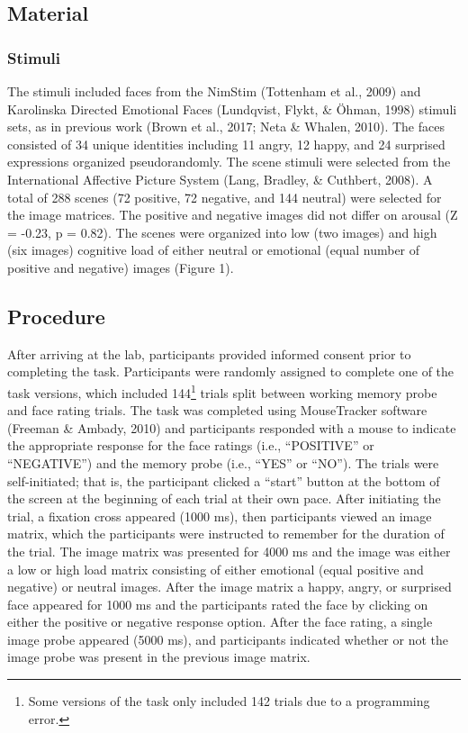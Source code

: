 \documentclass[man]{apa6}
\let\rmarkdownfootnote\footnote%
\def\footnote{\protect\rmarkdownfootnote}
\begin{document}
\hypertarget{material}{%
\subsection{Material}\label{material}}

\hypertarget{stimuli}{%
\subsubsection{Stimuli}\label{stimuli}}

The stimuli included faces from the NimStim (Tottenham et al., 2009) and Karolinska Directed Emotional Faces (Lundqvist, Flykt, \& Öhman, 1998) stimuli sets, as in previous work (Brown et al., 2017; Neta \& Whalen, 2010). The faces consisted of 34 unique identities including 11 angry, 12 happy, and 24 surprised expressions organized pseudorandomly. The scene stimuli were selected from the International Affective Picture System (Lang, Bradley, \& Cuthbert, 2008). A total of 288 scenes (72 positive, 72 negative, and 144 neutral) were selected for the image matrices. The positive and negative images did not differ on arousal (Z = -0.23, p = 0.82). The scenes were organized into low (two images) and high (six images) cognitive load of either neutral or emotional (equal number of positive and negative) images (Figure 1).

\hypertarget{procedure}{%
\subsection{Procedure}\label{procedure}}

After arriving at the lab, participants provided informed consent prior to completing the task. Participants were randomly assigned to complete one of the task versions, which included 144\footnote{Some versions of the task only included 142 trials due to a programming error.} trials split between working memory probe and face rating trials. The task was completed using MouseTracker software (Freeman \& Ambady, 2010) and participants responded with a mouse to indicate the appropriate response for the face ratings (i.e., \enquote{POSITIVE} or \enquote{NEGATIVE}) and the memory probe (i.e., \enquote{YES} or \enquote{NO}). The trials were self-initiated; that is, the participant clicked a \enquote{start} button at the bottom of the screen at the beginning of each trial at their own pace. After initiating the trial, a fixation cross appeared (1000 ms), then participants viewed an image matrix, which the participants were instructed to remember for the duration of the trial. The image matrix was presented for 4000 ms and the image was either a low or high load matrix consisting of either emotional (equal positive and negative) or neutral images. After the image matrix a happy, angry, or surprised face appeared for 1000 ms and the participants rated the face by clicking on either the positive or negative response option. After the face rating, a single image probe appeared (5000 ms), and participants indicated whether or not the image probe was present in the previous image matrix.
\end{document}
